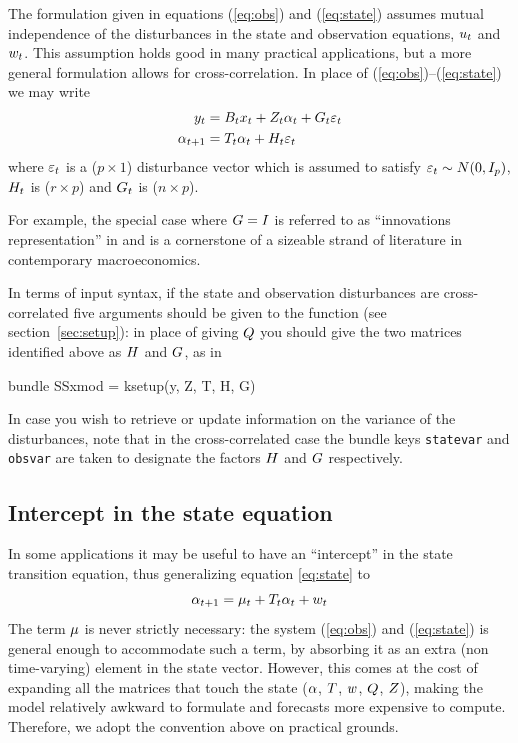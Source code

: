The formulation given in equations (\ref{eq:obs}) and (\ref{eq:state})
assumes mutual independence of the disturbances in the state and
observation equations, $u_t$ and $w_t$.  This assumption
holds good in many practical applications, but a more general
formulation allows for cross-correlation.  In place of
(\ref{eq:obs})--(\ref{eq:state}) we may write
%
\begin{align*}
  y_t &= B_tx_t + Z_t \alpha_t +
     G_t \varepsilon_t \\
  \alpha_{t+1} &= T_t \alpha_t +
     H_t \varepsilon_t
\end{align*}
%
where $\varepsilon_t$ is a ($p \times 1$) disturbance vector which is
assumed to satisfy $\varepsilon_t \sim N(0, I_p)$, $H_t$ is
($r \times p$) and $G_t$ is ($n \times p$).

For example, the special case where $G = I$ is referred to as
``innovations representation'' in \cite{hansen-sargent2013} and is a
cornerstone of a sizeable strand of literature in contemporary
macroeconomics.

In terms of input syntax, if the state and observation disturbances
are cross-correlated five arguments should be given to the
 function (see section~\ref{sec:setup}): in place of
giving $Q$ you should give the two matrices identified above as
$H$ and $G$, as in
\begin{code}
bundle SSxmod = ksetup(y, Z, T, H, G)
\end{code}

In case you wish to retrieve or update information on the variance of
the disturbances, note that in the cross-correlated case the bundle
keys \texttt{statevar} and \texttt{obsvar} are taken to designate the
factors $H$ and $G$ respectively.

\subsection{Intercept in the state equation}
\label{sec:stconst}

In some applications it may be useful to have an ``intercept'' in the
state transition equation, thus generalizing equation \eqref{eq:state}
to
\[
  \alpha_{t+1} = \mu_t + T_t \alpha_t + w_t \\
\]
The term $\mu$ is never strictly necessary: the system
(\ref{eq:obs}) and (\ref{eq:state}) is general enough to accommodate
such a term, by absorbing it as an extra (non time-varying) element in
the state vector.  However, this comes at the cost of expanding all
the matrices that touch the state ($\alpha$, $T$,
$w$, $Q$, $Z$), making the model relatively
awkward to formulate and forecasts more expensive to
compute. Therefore, we adopt the convention above on practical
grounds.

